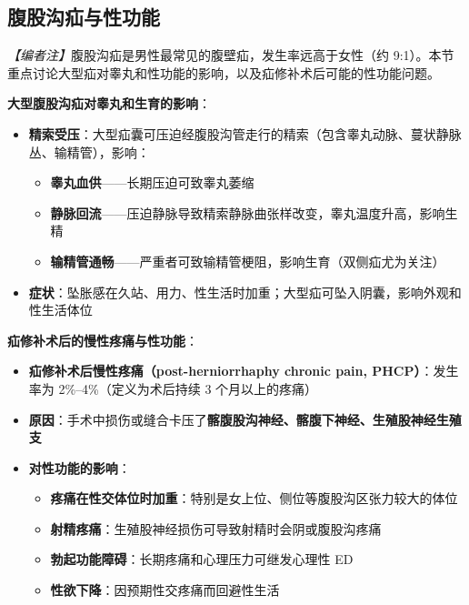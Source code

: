 \begin{enumerate}
\subsection{腹股沟疝与性功能}
\label{subsec:inguinal_hernia_sex}

\noindent\textit{【编者注】}腹股沟疝是男性最常见的腹壁疝，发生率远高于女性（约 9:1）。本节重点讨论大型疝对睾丸和性功能的影响，以及疝修补术后可能的性功能问题。

\vspace{0.5em}
\noindent\textbf{大型腹股沟疝对睾丸和生育的影响}：

\begin{itemize}[leftmargin=2cm]
	\item \textbf{精索受压}：大型疝囊可压迫经腹股沟管走行的精索（包含睾丸动脉、蔓状静脉丛、输精管），影响：
	\begin{itemize}
		\item \textbf{睾丸血供}——长期压迫可致睾丸萎缩
		\item \textbf{静脉回流}——压迫静脉导致精索静脉曲张样改变，睾丸温度升高，影响生精
		\item \textbf{输精管通畅}——严重者可致输精管梗阻，影响生育（双侧疝尤为关注）
	\end{itemize}
	\item \textbf{症状}：坠胀感在久站、用力、性生活时加重；大型疝可坠入阴囊，影响外观和性生活体位
\end{itemize}

\vspace{0.5em}
\noindent\textbf{疝修补术后的慢性疼痛与性功能}：

\begin{itemize}[leftmargin=2cm]
	\item \textbf{疝修补术后慢性疼痛（post-herniorrhaphy chronic pain, PHCP）}：发生率为 2\%--4\%（定义为术后持续 3 个月以上的疼痛）
	\item \textbf{原因}：手术中损伤或缝合卡压了\textbf{髂腹股沟神经、髂腹下神经、生殖股神经生殖支}
	\item \textbf{对性功能的影响}：
	\begin{itemize}
		\item \textbf{疼痛在性交体位时加重}：特别是女上位、侧位等腹股沟区张力较大的体位
		\item \textbf{射精疼痛}：生殖股神经损伤可导致射精时会阴或腹股沟疼痛
		\item \textbf{勃起功能障碍}：长期疼痛和心理压力可继发心理性 ED
		\item \textbf{性欲下降}：因预期性交疼痛而回避性生活
	\end{itemize}
\end{itemize}


\end{enumerate}
